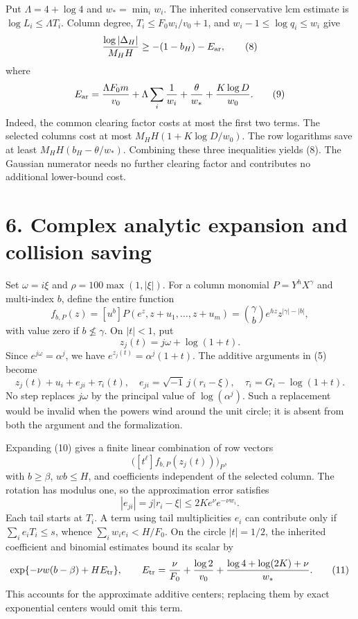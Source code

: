 \documentclass[11pt]{article}
\begin{document}
Put \(\Lambda=4+\log4\) and \(w_* =\min_iw_i\). The inherited
conservative lcm estimate is \(\log L_i\le\Lambda T_i\). Column degree,
\(T_i\le F_0w_i/v_0+1\), and \(w_i-1\le\log q_i\le w_i\) give \[
\frac{\log|\Delta_H|}{M_HH}\ge -(1-b_H)-E_{\rm ar},
\tag{8}
\] where \[
E_{\rm ar}=\frac{\Lambda F_0m}{v_0}
+\Lambda\sum_i\frac1{w_i}+\frac{\theta}{w_*}
+\frac{K\log D}{w_0}.
\tag{9}
\] Indeed, the common clearing factor costs at most the first two terms.
The selected columns cost at most \(M_HH(1+K\log D/w_0)\). The row
logarithms save at least \(M_HH(b_H-\theta/w_*)\). Combining these three
inequalities yields (8). The Gaussian numerator needs no further
clearing factor and contributes no additional lower-bound cost.

\section{6. Complex analytic expansion and collision
saving}\label{complex-analytic-expansion-and-collision-saving}

Set \(\omega=i\xi\) and \(\rho=100\max(1,|\xi|)\). For a column monomial
\(P=Y^hX^\gamma\) and multi-index \(b\), define the entire function \[
f_{b,P}(z)=[u^b]P(e^z,z+u_1,\ldots,z+u_m)
=\binom{\gamma}{b}e^{hz}z^{|\gamma|-|b|},
\] with value zero if \(b\not\le\gamma\). On \(|t|<1\), put \[
z_j(t)=j\omega+\log(1+t).
\] Since \(e^{j\omega}=\alpha^j\), we have \(e^{z_j(t)}=\alpha^j(1+t)\).
The additive arguments in (5) become \[
z_j(t)+u_i+e_{ji}+\tau_i(t),\quad
e_{ji}=\sqrt{-1}\,j(r_i-\xi),\quad
\tau_i=G_i-\log(1+t).
\tag{10}
\] No step replaces \(j\omega\) by the principal value of
\(\log(\alpha^j)\). Such a replacement would be invalid when the powers
wind around the unit circle; it is absent from both the argument and the
formalization.

Expanding (10) gives a finite linear combination of row vectors \[
\bigl([t^\ell]f_{b,P}(z_j(t))\bigr)_P,
\] with \(b\ge\beta\), \(wb\le H\), and coefficients independent of the
selected column. The rotation has modulus one, so the approximation
error satisfies \[
|e_{ji}|=j|r_i-\xi|\le 2K e^\nu e^{-\nu w_i}.
\] Each tail starts at \(T_i\). A term using tail multiplicities \(e_i\)
can contribute only if \(\sum_i e_iT_i\le s\), whence
\(\sum_iw_ie_i<H/F_0\). On the circle \(|t|=1/2\), the inherited
coefficient and binomial estimates bound its scalar by \[
\exp\{-\nu w(b-\beta)+HE_{\rm tr}\},\qquad
E_{\rm tr}=\frac\nu{F_0}+\frac{\log2}{v_0}
+\frac{\log4+\log(2K)+\nu}{w_*}.
\tag{11}
\] This accounts for the approximate additive centers; replacing them by
exact exponential centers would omit this term.
\end{document}
